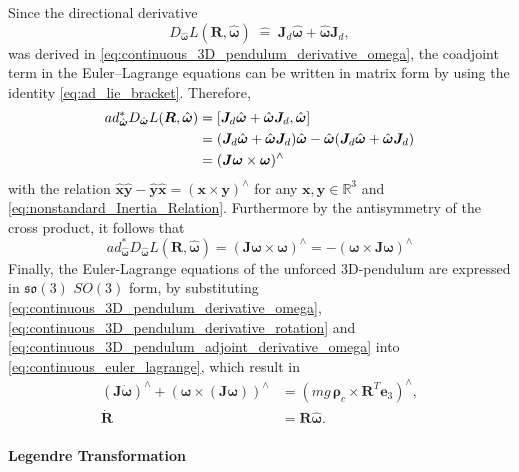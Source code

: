 Since the directional derivative
\[
D_{\hat{\bm{\omega}}}L(\bm{R},\hat{\bm{\omega}})
\;\widehat{=}\;
\bm{J}_d\hat{\bm{\omega}}+\hat{\bm{\omega}}\bm{J}_d,
\]
was derived in \eqref{eq:continuous_3D_pendulum_derivative_omega}, the coadjoint term in the Euler--Lagrange equations can be written in matrix form by using the identity \eqref{eq:ad_lie_bracket}. Therefore,
\begin{align}
ad^*_{\hat{\bm{\omega}}}D_{\hat{\bm{\omega}}}L(\bm{R},\hat{\bm{\omega}})
&=
\left[\bm{J}_d\hat{\bm{\omega}}+\hat{\bm{\omega}}\bm{J}_d,\hat{\bm{\omega}}\right] \notag \\
&=
(\bm{J}_d\hat{\bm{\omega}}+\hat{\bm{\omega}}\bm{J}_d)\hat{\bm{\omega}}
-
\hat{\bm{\omega}}(\bm{J}_d\hat{\bm{\omega}}+\hat{\bm{\omega}}\bm{J}_d) \notag \\
&=
(\bm{J}\bm{\omega} \times \bm{\omega})^\wedge \notag
\end{align}
with the relation $\hat{\bm{x}}\hat{\bm{y}}-\hat{\bm{y}}\hat{\bm{x}}=(\bm{x} \times \bm{y})^\wedge$ for any $\bm{x},\bm{y} \in \mathbb{R}^3$ and \eqref{eq:nonstandard_Inertia_Relation}. Furthermore by the antisymmetry of the cross product, it follows that
\begin{equation} \label{eq:continuous_3D_pendulum_adjoint_derivative_omega}   
ad^*_{\hat{\bm{\omega}}}D_{\hat{\bm{\omega}}}L(\bm{R},\hat{\bm{\omega}})
= (\bm{J}\bm{\omega} \times \bm{\omega})^\wedge
= -(\bm{\omega} \times \bm{J} \bm{\omega})^\wedge
\end{equation}
\indent Finally, the Euler-Lagrange equations of the unforced 3D-pendulum are expressed in $\mathfrak{so}(3)$ $SO(3)$ form, by substituting \eqref{eq:continuous_3D_pendulum_derivative_omega}, \eqref{eq:continuous_3D_pendulum_derivative_rotation} and \eqref{eq:continuous_3D_pendulum_adjoint_derivative_omega} into \eqref{eq:continuous_euler_lagrange}, which result in
\begin{subequations}\label{eq:continuous_3D_pendulum_euler_lagrange}
\begin{align}
 (\bm{J}\dot{\bm{\omega}})^\wedge + (\bm{\omega}\times (\bm{J}\bm{\omega}))^\wedge
 &= (mg\,\bm{\rho}_c \times \bm{R}^T\bm{e}_3)^\wedge,
 \label{eq:continuous_3D_pendulum_euler_lagrange_dynamics} \\
 \dot{\bm{R}} &= \bm{R}\hat{\bm{\omega}}.
 \label{eq:continuous_3D_pendulum_euler_lagrange_kinematics}
\end{align}
\end{subequations}

\paragraph{Legendre Transformation}

